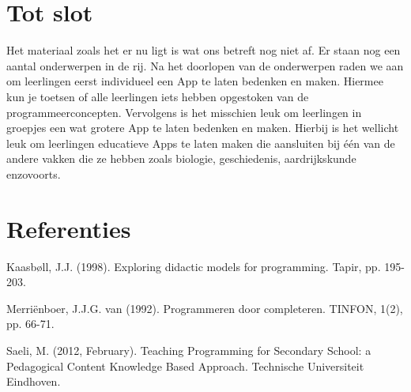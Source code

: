 \documentclass{BYUTextbook}
\begin{document}
\chapter{Tot slot}
Het materiaal zoals het er nu ligt is wat ons betreft nog niet af. Er staan nog een aantal onderwerpen in de rij. Na het doorlopen van de onderwerpen raden we aan om leerlingen eerst individueel een App te laten bedenken en maken. Hiermee kun je toetsen of alle leerlingen iets hebben opgestoken van de programmeerconcepten. Vervolgens is het misschien leuk om leerlingen in groepjes een wat grotere App te laten bedenken en maken. Hierbij is het wellicht leuk om leerlingen educatieve Apps te laten maken die aansluiten bij \'e\'en van de andere vakken die ze hebben zoals biologie, geschiedenis, aardrijkskunde enzovoorts.

\chapter{Referenties}
Kaasb\o ll, J.J. (1998). Exploring didactic models for programming. Tapir, pp. 195-203.

Merri\"{e}nboer, J.J.G. van (1992). Programmeren door completeren. TINFON, 1(2), pp. 66-71.

Saeli, M. (2012, February). Teaching Programming for Secondary School: a Pedagogical Content Knowledge Based Approach. Technische Universiteit Eindhoven.

\cleardoublepage
\end{document}
